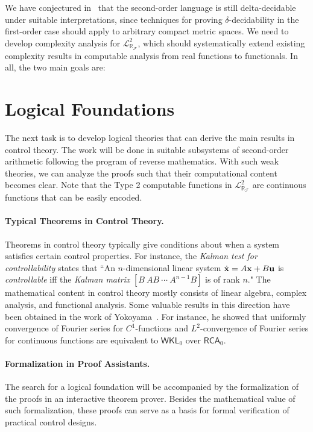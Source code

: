 \documentclass[10pt]{article}
\newcommand{\lrf}{\mathcal{L}_{\mathbb{R}_{\mathcal{F}}}}
\theoremstyle{definition}
\begin{document}
We have conjectured in~\cite{DBLP:conf/lics/GaoAC12} that the second-order language is still delta-decidable under suitable interpretations, since techniques for proving $\delta$-decidability in the first-order case should apply to arbitrary compact metric spaces. We need to develop complexity analysis for $\lrf^2$, which should systematically extend existing complexity results in computable analysis from real functions to functionals. In all, the two main goals are:

\section{Logical Foundations}


The next task is to develop logical theories that can derive the main results in control theory.
The work will be done in suitable subsystems of second-order arithmetic following the program of reverse mathematics. With such weak theories, we can analyze the proofs such that their computational content becomes clear. Note that the Type 2 computable functions in  $\lrf^2$ are continuous functions that can be easily encoded. 

\paragraph{Typical Theorems in Control Theory.} Theorems in control theory typically give conditions about when a system satisfies certain control properties. For instance, the {\em Kalman test for controllability} states that ``An $n$-dimensional linear system $\dot {\bf x} = A{\bf x}+B{\bf u}$ is {\em controllable} iff the {\em Kalman matrix}
$[B\ AB\ \cdots\ A^{n-1}B]$ is of rank $n$." The mathematical content in control theory mostly consists of linear algebra, complex analysis, and functional analysis. Some valuable results in this direction have been obtained in the work of Yokoyama~\cite{yoko}. For instance, he showed that uniformly convergence of Fourier series for $C^1$-functions and $L^2$-convergence of Fourier series for continuous functions are equivalent to $\mathsf{WKL}_0$ over $\mathsf{RCA}_0$. 

\paragraph{Formalization in Proof Assistants.} The search for a logical foundation will be accompanied by the formalization of the proofs in an interactive theorem prover. Besides the mathematical value of such formalization, these proofs can serve as a basis for formal verification of practical control designs. 
\end{document}

